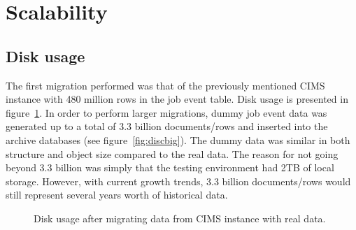 

\section{Scalability}
\subsection{Disk usage}
The first migration performed was that of the previously mentioned CIMS instance with 480 million rows in the job event table. Disk usage is presented in figure~\ref{fig:disc}. In order to perform larger migrations, dummy job event data was generated up to a total of 3.3 billion documents/rows and inserted into the archive databases (see figure~\ref{fig:discbig}). The dummy data was similar in both structure and object size compared to the real data. The reason for not going beyond 3.3 billion was simply that the testing environment had 2TB of local storage. However, with current growth trends, 3.3 billion documents/rows would still represent several years worth of historical data.

\begin{figure}[h!]
\centering
{}
\caption{Disk usage after migrating data from CIMS instance with real data.}
\label{fig:disc}
\end{figure}

